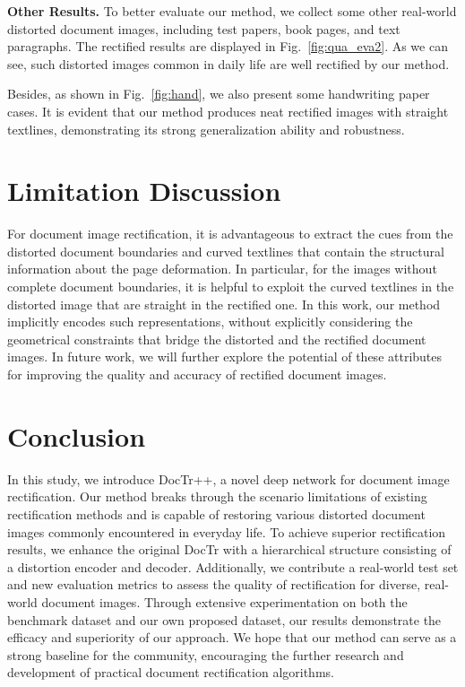 \documentclass[lettersize,journal]{IEEEtran}
\begin{document}
\smallskip
\textbf{Other Results.}
To better evaluate our method, we collect some other real-world distorted document images, including test papers, book pages, and text paragraphs. The rectified results are displayed in Fig.~\ref{fig:qua_eva2}. As we can see, such distorted images common in daily life are well rectified by our method.

Besides, as shown in Fig.~\ref{fig:hand}, we also present some handwriting paper cases. 
It is evident that our method produces neat rectified images with straight textlines, demonstrating its strong generalization ability and robustness.


\section{Limitation Discussion}
For document image rectification,
it is advantageous to extract the cues from the 
distorted document boundaries and curved textlines that contain the structural information about the page deformation. 
In particular, for the images without complete document boundaries,
it is helpful to exploit the curved textlines in the distorted image that are straight in the rectified one.
In this work, our method implicitly encodes such representations, without explicitly considering the geometrical constraints that bridge the distorted and the rectified document images.
In future work, we will further explore the potential of these attributes for improving the quality and accuracy of rectified document images.

\section{Conclusion}
In this study, we introduce DocTr++, a novel deep network for document image rectification.
Our method breaks through the scenario limitations of existing rectification methods and is capable of restoring various distorted document images commonly encountered in everyday life.
To achieve superior rectification results, we enhance the original DocTr with a hierarchical structure consisting of a distortion encoder and decoder. 
Additionally, we contribute a real-world test set and new evaluation metrics to assess the quality of rectification for diverse, real-world document images. 
Through extensive experimentation on both the benchmark dataset and our own proposed dataset, our results demonstrate the efficacy and superiority of our approach.
We hope that our method can serve as a strong baseline for the community,
encouraging the further research and development of practical document rectification algorithms.



{
	
	
}
\end{document}
